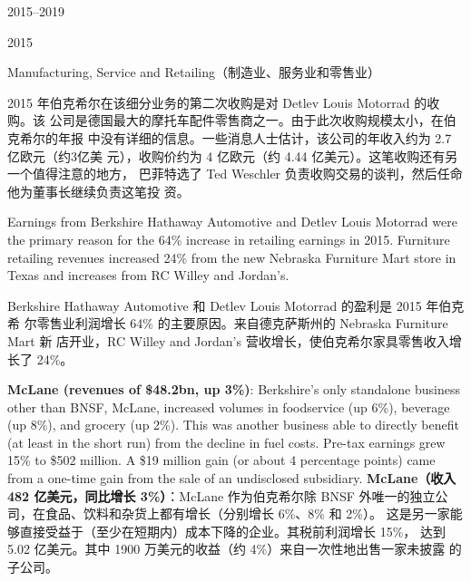 \begin{chapter}{2015--2019}
\begin{section}{2015}
\begin{subsection}{Manufacturing, Service and Retailing（制造业、服务业和零售业）}
\begin{verseparallel}
{  }
  {
    2015 年伯克希尔在该细分业务的第二次收购是对 Detlev Louis Motorrad 的收购。该
    公司是德国最大的摩托车配件零售商之一。由于此次收购规模太小，在伯克希尔的年报
    中没有详细的信息。一些消息人士估计，该公司的年收入约为 2.7 亿欧元（约3亿美
    元），收购价约为 4 亿欧元（约 4.44 亿美元）。这笔收购还有另一个值得注意的地方，
    巴菲特选了 Ted Weschler 负责收购交易的谈判，然后任命他为董事长继续负责这笔投
    资。
  }
\end{verseparallel}

\begin{verseparallel}
  {
    Earnings from Berkshire Hathaway Automotive and Detlev Louis Motorrad were
    the primary reason for the 64\% increase in retailing earnings in 2015.
    Furniture retailing revenues increased 24\% from the new Nebraska Furniture
    Mart store in Texas and increases from RC Willey and Jordan's. \\
  }
  {

    Berkshire Hathaway Automotive 和 Detlev Louis Motorrad 的盈利是 2015 年伯克希
    尔零售业利润增长 64\% 的主要原因。来自德克萨斯州的 Nebraska Furniture Mart 新
    店开业，RC Willey and Jordan's 营收增长，使伯克希尔家具零售收入增长了 24\%。

  }
\end{verseparallel}

\begin{verseparallel}
  {
    \textbf{McLane (revenues of \$48.2bn, up 3\%)}: Berkshire's only standalone
    business other than BNSF, McLane, increased volumes in foodservice (up
    6\%), beverage (up 8\%), and grocery (up 2\%). This was another business
    able to directly benefit (at least in the short run) from the decline in fuel
    costs. Pre-tax earnings grew 15\% to \$502 million. A \$19 million gain (or
    about 4 percentage points) came from a one-time gain from the sale of an
    undisclosed subsidiary.
  }
  {
    \textbf{McLane（收入 482 亿美元，同比增长 3\%）}：McLane 作为伯克希尔除 BNSF
    外唯一的独立公司，在食品、饮料和杂货上都有增长（分别增长 6\%、8\% 和 2\%）。
    这是另一家能够直接受益于（至少在短期内）成本下降的企业。其税前利润增长 15\%，
    达到 5.02 亿美元。其中 1900 万美元的收益（约 4\%）来自一次性地出售一家未披露
    的子公司。
  }
\end{verseparallel}
\end{subsection}


\end{section}
\end{chapter}
